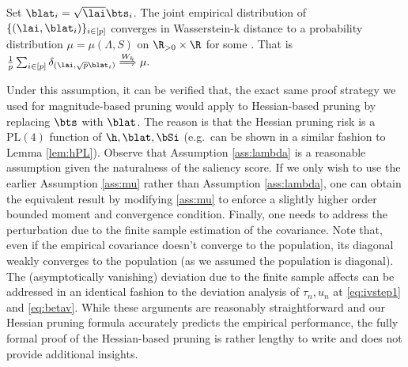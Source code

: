 {
\begin{assumption} \label{ass:lambda} Set $\blat_i=\sqrt{\lai}\bts_i$. The joint empirical distribution of $\{(\lai,\blat_i)\}_{i\in[p]}$ converges in {Wasserstein-k} distance to a probability distribution $\mu=\mu(\Lambda,S)$ on $\R_{>0}\times\R$ for some . That is
$
\frac{1}{p}\sum_{i\in[p]}\delta_{(\lai,\sqrt{p}\blat_i)} \stackrel{W_k}{\Longrightarrow} \mu.
$
\end{assumption}
}

Under this assumption, it can be verified that, the exact same proof strategy we used for magnitude-based pruning would apply to Hessian-based pruning by replacing $\bts$ with $\blat$. The reason is that the Hessian pruning risk is a $\text{PL}(4)$ function of $\h,\blat,\bSi$ (e.g.~can be shown in a similar fashion to Lemma \ref{lem:hPL}). Observe that Assumption \ref{ass:lambda} is a reasonable assumption given the naturalness of the saliency score. If we only wish to use the earlier Assumption \ref{ass:mu} rather than Assumption \ref{ass:lambda}, one can obtain the equivalent result by modifying \ref{ass:mu} to enforce a slightly higher order bounded moment and convergence condition. Finally, one needs to address the perturbation due to the finite sample estimation of the covariance. Note that, even if the empirical covariance doesn't converge to the population, its diagonal weakly converges to the population (as we assumed the population is diagonal). The (asymptotically vanishing) deviation due to the finite sample affects can be addressed in an identical fashion to the deviation analysis of $\tau_n,u_n$ at \eqref{eq:ivstep1} and \eqref{eq:betav}. While these arguments are reasonably straightforward and our Hessian pruning formula accurately predicts the empirical performance, the fully formal proof of the Hessian-based pruning is rather lengthy to write and does not provide additional insights. 







